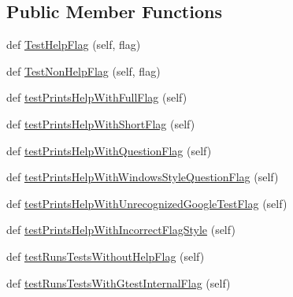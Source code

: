 \subsection*{Public Member Functions}
\begin{DoxyCompactItemize}
\item 
def \mbox{\hyperlink{classgoogletest-master_1_1googletest_1_1test_1_1gtest__help__test_1_1_g_test_help_test_a52b2db1afcfa5016234fcdf82e9f8ac9}{Test\+Help\+Flag}} (self, flag)
\item 
def \mbox{\hyperlink{classgoogletest-master_1_1googletest_1_1test_1_1gtest__help__test_1_1_g_test_help_test_af6b79311ef789d98a1ef1216dee4b985}{Test\+Non\+Help\+Flag}} (self, flag)
\item 
def \mbox{\hyperlink{classgoogletest-master_1_1googletest_1_1test_1_1gtest__help__test_1_1_g_test_help_test_a1f671889145a13253c351d3c59e0c279}{test\+Prints\+Help\+With\+Full\+Flag}} (self)
\item 
def \mbox{\hyperlink{classgoogletest-master_1_1googletest_1_1test_1_1gtest__help__test_1_1_g_test_help_test_a9cd2ea7989426a884c728ef8713b9cc5}{test\+Prints\+Help\+With\+Short\+Flag}} (self)
\item 
def \mbox{\hyperlink{classgoogletest-master_1_1googletest_1_1test_1_1gtest__help__test_1_1_g_test_help_test_ab39bceacb9f3f744551e4bcac1079b19}{test\+Prints\+Help\+With\+Question\+Flag}} (self)
\item 
def \mbox{\hyperlink{classgoogletest-master_1_1googletest_1_1test_1_1gtest__help__test_1_1_g_test_help_test_a7512f393cd4a6833edc3471759a7ebab}{test\+Prints\+Help\+With\+Windows\+Style\+Question\+Flag}} (self)
\item 
def \mbox{\hyperlink{classgoogletest-master_1_1googletest_1_1test_1_1gtest__help__test_1_1_g_test_help_test_a132e3076d30834b64747bf8b7165b027}{test\+Prints\+Help\+With\+Unrecognized\+Google\+Test\+Flag}} (self)
\item 
def \mbox{\hyperlink{classgoogletest-master_1_1googletest_1_1test_1_1gtest__help__test_1_1_g_test_help_test_a97cdae7043d0b40cb6171f94849ed67c}{test\+Prints\+Help\+With\+Incorrect\+Flag\+Style}} (self)
\item 
def \mbox{\hyperlink{classgoogletest-master_1_1googletest_1_1test_1_1gtest__help__test_1_1_g_test_help_test_ad101f38e34a0f29e6b8d343f21ea23bf}{test\+Runs\+Tests\+Without\+Help\+Flag}} (self)
\item 
def \mbox{\hyperlink{classgoogletest-master_1_1googletest_1_1test_1_1gtest__help__test_1_1_g_test_help_test_ab5f1f48e1dbbad53f6bab984f9326df8}{test\+Runs\+Tests\+With\+Gtest\+Internal\+Flag}} (self)
\end{DoxyCompactItemize}


